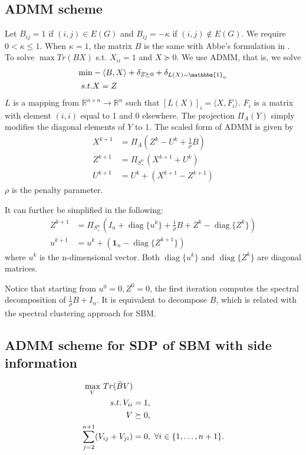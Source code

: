 \documentclass{ctexart}
\DeclareMathOperator{\diag}{diag}
\begin{document}
\subsection{ADMM scheme}
Let $B_{ij} = 1$ if $(i,j) \in E(G)$ and $B_{ij} = -\kappa$ if $(i,j) \not \in E(G)$.
We require $0<\kappa \leq 1$. When $\kappa = 1$, the matrix $B$ is the same with
Abbe's formulation in \cite{abbe2015exact}.
To solve $\max Tr(BX)$ s.t. $X_{ii} = 1$ and $X \succeq 0$.
We use ADMM, that is, we solve
\begin{align*}
\min & - \langle B, X\rangle + \delta_{Z \succeq 0} + \delta_{L(X) = \mathbbm{1}_n}\\
s.t.& X=Z
\end{align*}
$L$ is a mapping from $\mathbb{R}^{n \times n} \to \mathbb{R}^n$ such that $[L(X)]_i =  \langle X,F_i \rangle $.
$F_i$ is a matrix with element $(i,i)$ equal to 1 and 0 elsewhere.
The projection $\Pi_{A}(Y)$ simply modifies the diagonal elements of $Y$ to $1$.
The scaled form of ADMM \cite{boyd2011distributed} is given by
\begin{align}
X^{k+1} &= \Pi_A(Z^k - U^k + \frac{1}{\rho}B)\label{eq:admm} \\
Z^{k+1} &= \Pi_{S_+^n}(X^{k+1} + U^{k}) \\
U^{k+1} &= U^k + (X^{k+1} - Z^{k+1}) 
\end{align}
$\rho$ is the penalty parameter.

It can further be simplified in the following:
\begin{align}
	Z^{k+1} &= \Pi_{S_+^n}(I_n + \diag\{u^k\} + \frac{1}{\rho} B
	+ Z^k - \diag\{Z^k\}) \\
	u^{k+1} &= u^k + (\mathbf{1}_n - \diag\{Z^{k+1}\}) 
	\end{align}
where $u^k$ is the n-dimensional vector.
Both $\diag\{u^k\}$ and $\diag\{Z^k\}$ are diagonal matrices.

Notice that starting from $u^0=0, Z^0=0$, the first iteration
computes the spectral decomposition of $\frac{1}{\rho}B + I_n$.
It is equivalent to decompose $B$, which is related with
the spectral clustering approach for SBM.

\subsection{ADMM scheme for SDP of SBM with side information}
\begin{align}
		\max_V\, Tr(\tilde{B}V)  &\notag\\
s.t.\, V_{ii} &= 1, \notag\\
V &\succeq 0, \notag\\
\sum_{j=2}^{n+1} (V_{ij} + V_{ji})& = 0,~\forall i\in\{1,\ldots,n+1\}. \label{eq:sdp}
\end{align}
\end{document}
